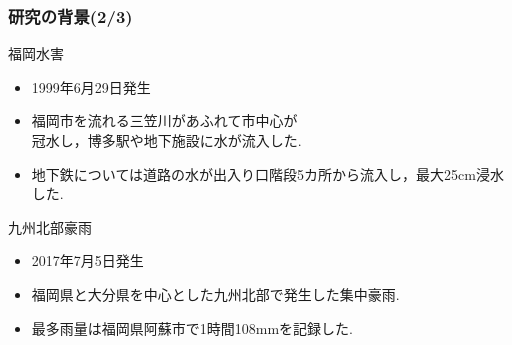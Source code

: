 \documentclass[12pt,dvipdfmx]{beamer}
\begin{document}
    {
      \frametitle{研究の背景(2/3)}

      \begin{minipage}{0.6\columnwidth}
        \centering
      \begin{beamerboxesrounded}
        {福岡水害}
        \begin{itemize}
          \footnotesize
        \item 1999年6月29日発生

        \item 福岡市を流れる三笠川があふれて市中心が\\冠水し，博多駅や地下施設に水が流入した.

        \item 地下鉄については道路の水が出入り口階段5カ所から流入し，最大25cm浸水した.

        \end{itemize}
      \end{beamerboxesrounded}
      

      \begin{beamerboxesrounded}
        {九州北部豪雨}
          \begin{itemize}
            \footnotesize
        \item 2017年7月5日発生

        \item 福岡県と大分県を中心とした九州北部で発生した集中豪雨.

        \item 最多雨量は福岡県阿蘇市で1時間108mmを記録した.


\end{itemize}
\end{beamerboxesrounded}
\end{minipage}}
\end{document}
